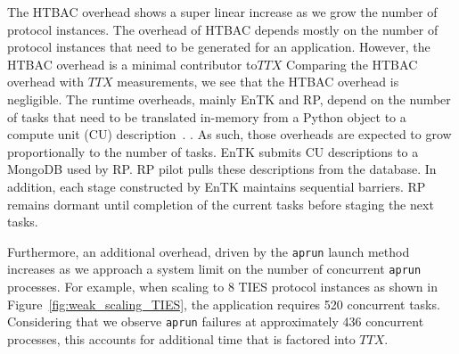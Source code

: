 The HTBAC overhead shows a super linear increase as we grow the number of 
protocol instances. 
The overhead of HTBAC depends mostly on the number of protocol instances that 
need to be generated for an application. However, the HTBAC overhead is a minimal contributor to\(TTX\)   
Comparing the HTBAC overhead with \(TTX\) measurements, we see that the HTBAC 
overhead is negligible. The runtime overheads, mainly EnTK and RP, depend on the
number of tasks that need to be translated in-memory from a Python object to
a compute unit (CU) description~\cite{dakka2017}. 
. As such, those
overheads are expected to grow proportionally to the number of tasks. EnTK
submits CU descriptions to a MongoDB used by RP. RP pilot pulls these
descriptions from the database.
In addition, each stage constructed by EnTK maintains sequential barriers.
 RP remains dormant until
completion of the current tasks before staging the next tasks. 


Furthermore, an additional overhead, driven by the \texttt{aprun}  
launch method increases as we approach a system limit on the number of 
concurrent 
\texttt{aprun} processes. For example, when scaling to 8 TIES protocol instances 
as shown in Figure~\ref{fig:weak_scaling_TIES}, the application requires 520 
concurrent tasks. Considering that we observe \texttt{aprun} failures at 
approximately 436 concurrent processes, this accounts for additional time
that is factored into \(TTX\).  


